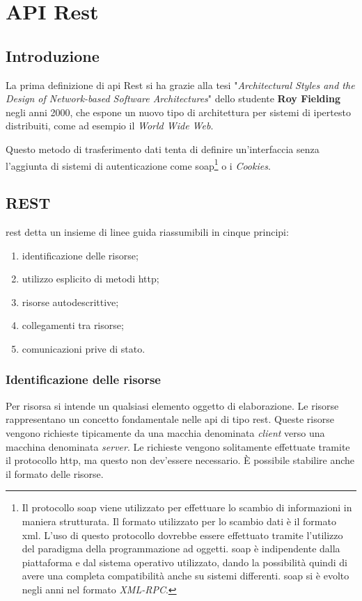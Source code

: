 \chapter{API Rest}

\section{Introduzione}
La prima definizione di \gls{api} Rest si ha grazie alla tesi
"\textit{Architectural Styles and the Design of Network-based Software
Architectures}" dello studente \textbf{Roy Fielding} negli anni 2000, che
espone un nuovo tipo di architettura per sistemi di ipertesto distribuiti, come
ad esempio il \textit{World Wide Web}.

Questo metodo di trasferimento dati tenta di definire un'interfaccia senza
l'aggiunta di sistemi di autenticazione come \gls{soap}\footnote{Il protocollo
\gls{soap} viene utilizzato per effettuare lo
scambio di informazioni in maniera strutturata. Il formato utilizzato per lo
scambio dati è il formato \gls{xml}. L'uso di questo protocollo dovrebbe essere
effettuato tramite l'utilizzo del paradigma della programmazione ad oggetti.
\gls{soap} è indipendente dalla piattaforma e dal sistema operativo utilizzato,
dando la possibilità quindi di avere una completa compatibilità anche su
sistemi differenti. \gls{soap} si è evolto negli anni nel formato
\textit{XML-RPC}.} o i \textit{Cookies}.

\section{REST}

\gls{rest} detta un insieme di linee guida riassumibili in cinque principi:
\begin{enumerate}
  \item identificazione delle risorse;
  \item utilizzo esplicito di metodi \gls{http};
  \item risorse autodescrittive;
  \item collegamenti tra risorse;
  \item comunicazioni prive di stato.
\end{enumerate}

\subsection{Identificazione delle risorse}
Per risorsa si intende un qualsiasi elemento oggetto di elaborazione.
Le risorse rappresentano un concetto fondamentale nelle \gls{api} di tipo
\gls{rest}. Queste risorse vengono richieste tipicamente da una macchia
denominata \textit{client} verso una macchina denominata \textit{server}. Le
richieste vengono solitamente effettuate tramite il protocollo \gls{http}, ma
questo non dev'essere necessario. È possibile stabilire anche il formato delle
risorse.

